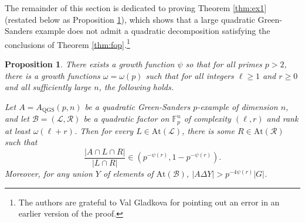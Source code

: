 \documentclass[12pt,oneside,british,a4wide]{amsart}
\newtheorem{proposition}[theorem]{Proposition}
\numberwithin{equation}{section}
\theoremstyle{definition}
\def\F{\mathbb{F}}
\def\QGS{\mathrm{QGS}}
\newcommand{\calL}{\mathcal{L}}
\newcommand{\calB}{\mathcal{B}}
\newcommand{\calR}{\mathcal{R}}
\newcommand{\At}{{\mathrm{At}}}
\begin{document}
The remainder of this section is dedicated to proving Theorem \ref{thm:ex1} (restated below as Proposition \ref{prop:qgsbad}), which shows that a large quadratic Green-Sanders example does not admit a quadratic decomposition satisfying the conclusions of Theorem \ref{thm:fop}.\footnote{The authors are grateful to Val Gladkova for pointing out an error in an earlier version of the proof.}

\begin{proposition}\label{prop:qgsbad}
There exists a growth function $\psi$ so that for all primes $p>2$, there is a growth functions $\omega=\omega(p)$ such that for all integers $\ell\geq 1$ and $r\geq 0$ and all sufficiently large $n$, the following holds. 

Let $A=A_{\QGS}(p,n)$ be a quadratic Green-Sanders $p$-example of dimension $n$, and let $\calB=(\calL,\calR)$ be a quadratic factor on $\F_p^n$ of complexity $(\ell,r)$ and rank at least $\omega(\ell+r)$. Then for every $L\in \At(\calL)$, there is some $R\in \At(\calR)$ such that 
$$
\frac{|A\cap L\cap R|}{|L\cap R|}\in (p^{-\psi(r)}, 1-p^{-\psi(r)}).
$$ 
Moreover, for any union $Y$ of elements of $\At(\calB)$, $|A\Delta Y|>p^{-4\psi(r)}|G|$. 
\end{proposition}
\end{document}
